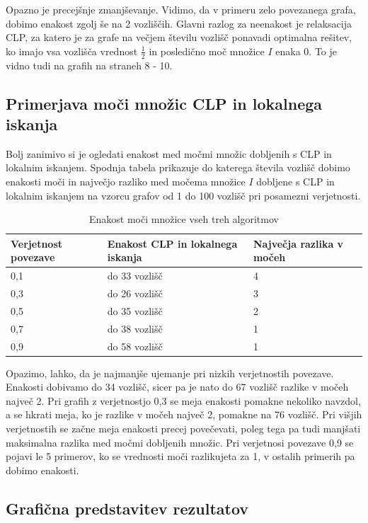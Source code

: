 \documentclass[a4paper, 12 pt]{article}
\theoremstyle{definition}
\theoremstyle{plain}
\theoremstyle{remark}
\begin{document}
Opazno je precejšnje zmanjševanje. Vidimo, da v primeru zelo povezanega grafa, dobimo enakost zgolj še na 2 vozliščih. Glavni razlog za neenakost je relaksacija CLP, za katero je za grafe na večjem številu vozlišč ponavadi optimalna rešitev, ko imajo vsa vozlišča vrednost $\frac{1}{2}$ in posledično moč množice $I$ enaka 0. To je vidno tudi na grafih na straneh 8 - 10.

\subsection{Primerjava moči množic CLP in lokalnega iskanja}

Bolj zanimivo si je ogledati enakost med močmi množic dobljenih s CLP in lokalnim iskanjem. Spodnja tabela prikazuje do katerega števila vozlišč dobimo enakosti moči in največjo razliko med močema množice $I$ dobljene s CLP in lokalnim iskanjem na vzorcu grafov od 1 do 100 vozlišč pri posamezni verjetnosti.

\begin{table}[H]
\centering
\begin{tabular}{|p{2.1cm}|p{3.7cm}|p{3.5cm}|}
\hline
\textbf{Verjetnost povezave}  & \textbf{Enakost CLP in lokalnega iskanja} & \textbf{Največja razlika v močeh} \\ \hline
0,1    & do 33 vozlišč &  4\\ \hline
0,3    & do 26 vozlišč  &  3   \\ \hline
0,5    & do 35 vozlišč &  2 \\ \hline
0,7    & do 38 vozlišč  &  1\\ \hline
0,9    & do 58 vozlišč  &  1  \\ \hline
\end{tabular}
\caption{Enakost moči množice vseh treh algoritmov}
\label{fig:enakost vseh treh} 
\end{table}

Opazimo, lahko, da je najmanjše ujemanje pri nizkih verjetnostih povezave. Enakosti dobivamo do 34 vozlišč, sicer pa je nato do 67 vozlišč razlike v močeh največ 2. Pri grafih z verjetnostjo 0,3 se meja enakosti pomakne nekoliko navzdol, a se hkrati meja, ko je razlike v močeh največ 2, pomakne na 76 vozlišč. Pri višjih verjetnostih se začne meja enakosti precej povečevati, poleg tega pa tudi manjšati maksimalna razlika med močmi dobljenih množic. Pri verjetnosi povezave 0,9 se pojavi le 5 primerov, ko se vrednosti moči razlikujeta za 1, v ostalih primerih pa dobimo enakosti.

\subsection{Grafična predstavitev rezultatov}
\end{document}
